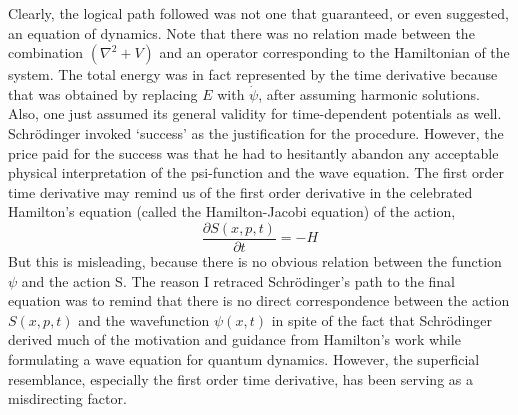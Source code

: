 Clearly, the logical path followed was not one that guaranteed, or even suggested, an
equation of dynamics. Note that there was no relation made between the combination
$(\nabla^2 + V)$ and an operator corresponding to the Hamiltonian of the system. The total energy
was in fact represented by the time derivative because that was obtained by replacing $E$
with $\dot{\psi}$, after assuming harmonic solutions. Also, one just assumed its general validity for
time-dependent potentials as well. Schr\"{o}dinger invoked `success' as the justification for the
procedure. However, the price paid for the success was that he had to hesitantly abandon
any acceptable physical interpretation of the psi-function and the wave equation. The first
order time derivative may remind us of the first order derivative in the celebrated Hamilton's
equation (called the Hamilton-Jacobi equation) of the action,
\begin{equation*}
\frac{\partial S (x,p,t)}{\partial t} = - H \tag{7}\label{c14-eq7}
\end{equation*}
But this is misleading, because there is no obvious relation between the function $\psi$ and the
action S. The reason I retraced Schr\"{o}dinger's path to the final equation was to remind
that there is no direct correspondence between the action $S(x, p, t)$ and the wavefunction
$\psi(x, t)$ in spite of the fact that Schr\"{o}dinger derived much of the motivation and guidance
from Hamilton's work while formulating a wave equation for quantum dynamics. However,
the superficial resemblance, especially the first order time derivative, has been serving as a
misdirecting factor.

